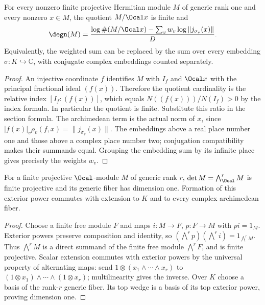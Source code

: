 \begin{lemma}
\label{lem:line-degree-quotient-formula}
\leanok
For every nonzero finite projective Hermitian module $M$ of generic rank
one and every nonzero $x\in M$, the quotient $M/\Ocal x$ is finite and
\[
 \degn(M)=\frac{\log\#(M/\Ocal x)
   -\sum_v w_v\log\|j_{\sigma_v}(x)\|}{D}.
\]
Equivalently, the weighted sum can be replaced by the sum over every
embedding $\sigma:K\hookrightarrow\mathbb C$, with conjugate complex
embeddings counted separately.
\end{lemma}
\begin{proof}
An injective coordinate $f$ identifies $M$ with $I_f$ and $\Ocal x$
with the principal fractional ideal $(f(x))$. Therefore the quotient
cardinality is the relative index $[I_f:(f(x))]$, which equals
$N((f(x)))/N(I_f)>0$ by the index formula. In particular the quotient
is finite. Substitute this ratio in the section formula. The archimedean
term is the actual norm of $x$, since
$|f(x)|_v\rho_v(f,x)=\|j_{\sigma_v}(x)\|$.
The embeddings above a real place number one and those above a complex
place number two; conjugation compatibility makes their summands equal.
Grouping the embedding sum by its infinite place gives precisely the weights $w_v$.
\end{proof}

\begin{lemma}
\label{lem:integral-determinant-line}
\leanok
For a finite projective $\Ocal$-module $M$ of generic rank $r$,
$\det M=\bigwedge^r_{\Ocal}M$ is finite projective and its generic fiber
has dimension one. Formation of this exterior power commutes with
extension to $K$ and to every complex archimedean fiber.
\end{lemma}
\begin{proof}
Choose a finite free module $F$ and maps $i:M\to F$, $p:F\to M$ with
$pi=1_M$. Exterior powers preserve composition and identity, so
$(\bigwedge^r p)(\bigwedge^r i)=1_{\bigwedge^r M}$. Thus $\bigwedge^r M$
is a direct summand of the finite free module $\bigwedge^r F$, and is
finite projective. Scalar extension commutes with exterior powers by
the universal property of alternating maps: send
$1\otimes(x_1\wedge\cdots\wedge x_r)$ to
$(1\otimes x_1)\wedge\cdots\wedge(1\otimes x_r)$; multilinearity gives
the inverse. Over $K$ choose a basis of the rank-$r$ generic fiber.
Its top wedge is a basis of its top exterior power, proving dimension one.
\end{proof}


